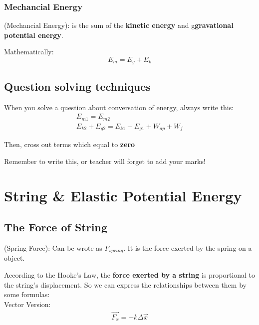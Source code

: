 \subsubsection*{Mechancial Energy}
\begin{definition}
    (Mechancial Energy): is the sum of the \textbf{kinetic energy} and g\textbf{gravational potential energy}.
\end{definition}

Mathematically:
\begin{equation}
    E_m = E_g + E_k
\end{equation}

\subsection{Question solving techniques}
When you solve a question about conversation of energy, always write this:
\begin{gather}
    E_{m1} = E_{m2}\\
    E_{k2} + E_{g2} = E_{k1} + E_{g1} + W_{ap} + W_{f}
\end{gather}

Then, cross out terms which equal to \textbf{zero}

\begin{remark}
    Remember to write this, or teacher will forget to add your marks!
\end{remark}

\section{String \& Elastic Potential Energy}
\subsection{The Force of String}
\begin{definition}
    (Spring Force): Can be wrote as $F_{spring}$. It is the force exerted by the spring on a object. 
\end{definition}

According to the Hooke's Law, the \textbf{force exerted by a string} is proportional to the string's displacement. So we can express the relationships between
them by some formulas:\\

Vector Version:
\begin{gather}
    \vec{F_x} = -k\Delta \vec{x}
\end{gather}

